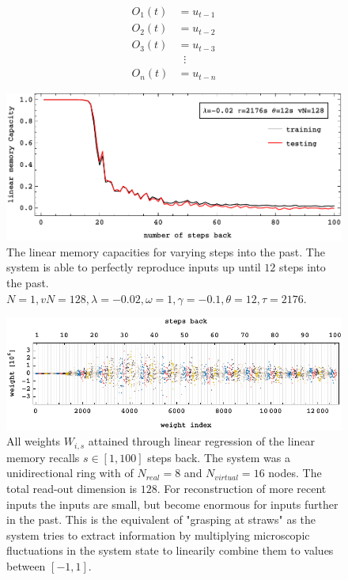 	\begin{equation}
		\begin{split}
		O_{1}(t) & = u_{t - 1} \\
		O_{2}(t) & = u_{t - 2} \\				
		O_{3}(t) & = u_{t - 3} \\
				 &\;\; \vdots \\
		O_{n}(t) & = u_{t - n}
		\end{split}
		\label{eq:linear_recall_task}
	\end{equation}


\begin{figure}
	\centering
	\includegraphics[width=0.99\linewidth]{pics/linearMemoryCurveN1}
	\caption{The linear memory capacities for varying steps into the past. The system is able to perfectly reproduce inputs up until $12$ steps into the past. $N=1, vN=128, \lambda=-0.02, \omega=1, \gamma=-0.1, \theta=12, \tau=2176$. }
	\label{fig:linearMemoryRecallCurveN1}
\end{figure}

\begin{figure}
	\centering
	\includegraphics[width=0.99\linewidth]{pics/weight_plot}
	\caption{All weights $W_{i,s}$ attained through linear regression of the linear memory recalls $s \in [1,100]$ steps back. The system was a unidirectional ring with of $N_{real}=8$ and $N_{virtual}=16$ nodes. The total read-out dimension is $128$. For reconstruction of more recent inputs the inputs are small, but become enormous for inputs further in the past. This is the equivalent of "grasping at straws" as the system tries to extract information by multiplying microscopic fluctuations in the system state to linearily combine them to values between $[-1,1]$.}
	\label{fig:linearMemoryRecallWeights}
\end{figure}


